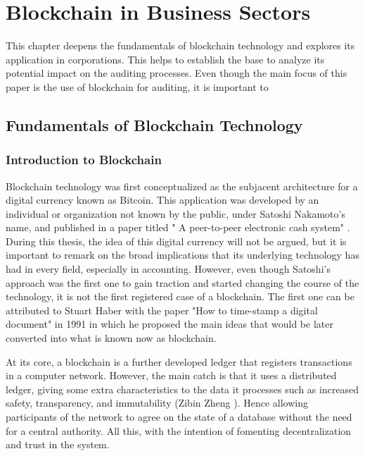 \chapter{Blockchain in Business Sectors}
\label{ch:blockchain}

This chapter deepens the fundamentals of blockchain technology and explores its application in corporations. This helps to establish the base to analyze its potential impact on the auditing processes. 
Even though the main focus of this paper is the use of blockchain for auditing, it is important to 

\section{Fundamentals of Blockchain Technology}

\subsection{Introduction to Blockchain}
\label{Introduction to Blockchain}

Blockchain technology was first conceptualized as the subjacent architecture for a digital currency known as Bitcoin. This application was developed by an individual or organization not known by the public, under Satoshi Nakamoto's name, and published in a paper titled " A peer-to-peer electronic cash system" \cite{BTCWhitePaper}. During this thesis, the idea of this digital currency will not be argued, but it is important to remark on the broad implications that its underlying technology has had in every field, especially in accounting. However, even though Satoshi's approach was the first one to gain traction and started changing the course of the technology, it is not the first registered case of a blockchain. The first one can be attributed to Stuart Haber \cite{firstBlockchain} with the paper "How to time-stamp a digital document" in 1991 in which he proposed the main ideas that would be later converted into what is known now as blockchain. 

At its core, a blockchain is a further developed ledger that registers transactions in a computer network. However, the main catch is that it uses a distributed ledger, giving some extra characteristics to the data it processes such as increased safety, transparency, and immutability (Zibin Zheng \cite{attributesBlockchain}). Hence allowing participants of the network to agree on the state of a database without the need for a central authority. All this, with the intention of fomenting decentralization and trust in the system. 

